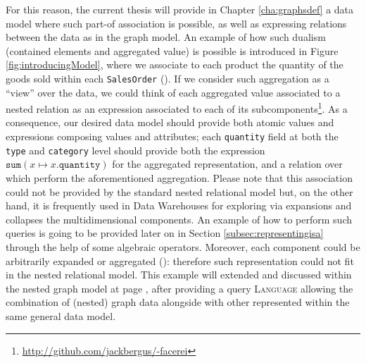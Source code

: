\begin{example}[label=ex:inaggr]
For this reason, the current thesis will provide in Chapter \ref{cha:graphsdef} a data model where such part-of association is possible, as well as expressing relations between the data as in the graph model. An example of how such dualism (contained elements and aggregated value) is possible is introduced in Figure \vref{fig:introducingModel}, where we associate to each product the quantity of the goods sold within each \texttt{SalesOrder} (). If we consider such aggregation as a ``view'' over the data, we could think of each aggregated value associated to a nested relation as an expression associated to each of its subcomponents\footnote{\url{http://github.com/jackbergus/-facerei}}. As a consequence, our desired data model should provide both atomic values and expressions composing values and attributes; each \texttt{quantity} field at both the \texttt{type} and \texttt{category} level should provide both the expression $\texttt{sum}(x\mapsto x.\texttt{quantity})$ for the aggregated representation, and a relation over which perform the aforementioned aggregation. Please note that this association could not be provided by the standard nested relational model but, on the other hand, it is frequently used in Data Warehouses for exploring via expansions and collapses the multidimensional components. An example of how to perform such queries is going to be provided later on in Section \vref{subsec:representingisa} through the help of some algebraic operators. Moreover, each component could be arbitrarily expanded or aggregated (): therefore such representation could not fit in the nested relational model. This example will extended and discussed within the nested graph model at page \pageref{ex:firstforgrammars}, after providing a query  \textsc{Language} allowing the combination of (nested) graph data alongside with other represented within the same general data model.
\end{example}
